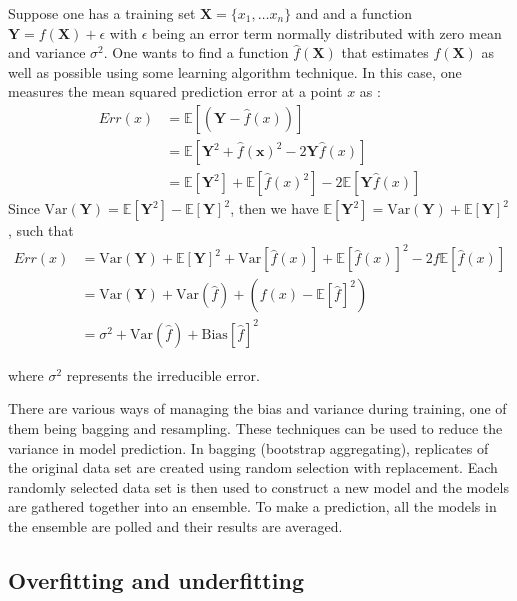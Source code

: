 Suppose  one has a training set $\textbf{X}=\{x_1,\dots x_n\}$ and and a function $\textbf{Y}=f(\textbf{X})+\epsilon$ with $\epsilon$ being an error term normally distributed with zero mean and variance $\sigma^2$. One wants to find a function $\widehat{f}(\textbf{X})$  that estimates $f(\textbf{X})$ as well as possible using some learning algorithm technique. In this case, one measures the mean squared prediction error at a point $x$ as :
\begin{align*}
Err(x)&= \mathbb{E}\left[(\textbf{Y}- \widehat{f}(x) ) \right]\\
&= \mathbb{E}\left[ \textbf{Y}^2 +\widehat{f}(\textbf{x})^2 -2\textbf{Y}\widehat{f}(x)\right]\\
&= \mathbb{E}\left[\textbf{Y}^2 \right] + \mathbb{E}\left[\widehat{f}(x)^2 \right]- 2\mathbb{E}\left[\textbf{Y}\widehat{f}(x)\right]
\end{align*}
Since $\text{Var}(\textbf{Y}) = \mathbb{E}\left[\textbf{Y}^2 \right]- \mathbb{E}\left[\textbf{Y}\right]^2$, then we have  $\mathbb{E}\left[\textbf{Y}^2 \right] =\text{Var}(\textbf{Y}) + \mathbb{E}\left[\textbf{Y}\right]^2$, such that
\begin{align*}
Err(x)&= \text{Var}(\textbf{Y}) + \mathbb{E}\left[\textbf{Y}\right]^2 + \text{Var}\left[\widehat{f}(x)\right] + \mathbb{E}\left[\widehat{f}(x) \right]^2- 2f\mathbb{E}\left[\widehat{f}(x) \right]\\
&= \text{Var}(\textbf{Y}) + \text{Var}(\widehat{f}) + (f(x)- \mathbb{E}\left[
\widehat{f}\right]^2)\\
&= \sigma^2 + \text{Var}(\widehat{f})+ \text{Bias}\left[\widehat{f}\right]^2
\end{align*}

where $\sigma^2$ represents the irreducible error. 

There are various ways of managing the bias and variance during training, one of them being bagging and resampling. These techniques can be used to reduce the variance in model prediction. In bagging (bootstrap aggregating), replicates of the original data set are created using random selection with replacement. Each randomly selected data set is then used to construct a new model and the models are gathered together into an ensemble. To make a prediction, all the models in the ensemble are polled and their results are averaged.

\subsection{Overfitting and underfitting}

